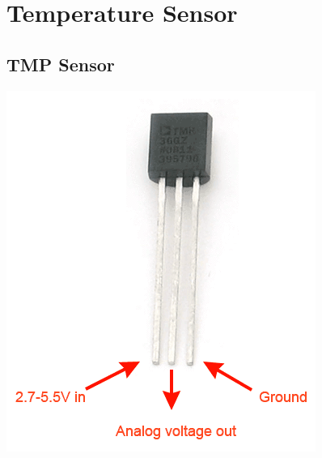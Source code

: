\documentclass[a4paper,12pt,twoside,openright,titlepage]{book}
\begin{document}
\section{Temperature Sensor}
\subsection{TMP Sensor}
\includegraphics[scale=1]{TMP-36}
\end{document}
